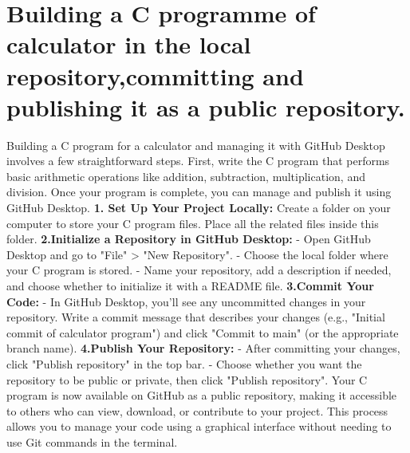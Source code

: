 \documentclass[12pt, a4paper]{article}
\begin{document}
\newpage


\section*{Building a C programme of calculator in the local repository,committing and publishing it as a public repository.}
\vspace{1cm}
Building a C program for a calculator and managing it with GitHub Desktop involves a few straightforward steps. First, write the C program that performs basic arithmetic operations like addition, subtraction, multiplication, and division. Once your program is complete, you can manage and publish it using GitHub Desktop.
\vspace{1.5cm}
\textbf{1. Set Up Your Project Locally:} Create a folder on your computer to store your C program files. Place all the related files inside this folder.
\vspace{1.5cm}
\textbf{2.Initialize a Repository in GitHub Desktop:}
    - Open GitHub Desktop and go to "File" > "New Repository".
    - Choose the local folder where your C program is stored.
    - Name your repository, add a description if needed, and choose whether to initialize it with a README file.
\vspace{1.5cm}
\textbf{3.Commit Your Code:}
    - In GitHub Desktop, you’ll see any uncommitted changes in your repository. Write a commit message that describes your changes (e.g., "Initial commit of calculator program") and click "Commit to main" (or the appropriate branch name).
\vspace{1.5cm}
\textbf{4.Publish Your Repository:}
    - After committing your changes, click "Publish repository" in the top bar.
    - Choose whether you want the repository to be public or private, then click "Publish repository".
\vspace{1.5cm}
Your C program is now available on GitHub as a public repository, making it accessible to others who can view, download, or contribute to your project. This process allows you to manage your code using a graphical interface without needing to use Git commands in the terminal.

\newpage
\end{document}

